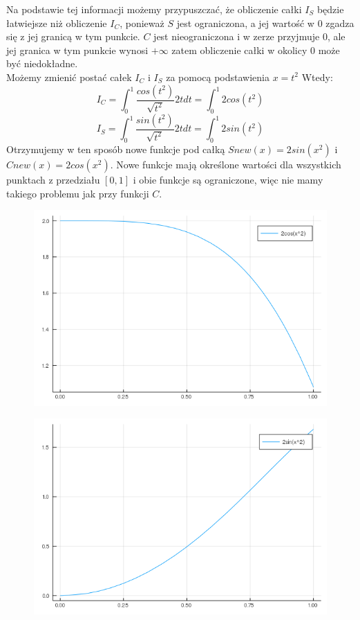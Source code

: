 \documentclass{article}
\begin{document}
Na podstawie tej informacji możemy przypuszczać, że obliczenie całki $I_S$ będzie łatwiejsze niż obliczenie $I_C$, ponieważ $S$ jest ograniczona, a jej wartość w $0$ zgadza się z jej granicą w tym punkcie. $C$ jest nieograniczona i w zerze przyjmuje $0$, ale jej granica w tym punkcie wynosi $+\infty$ zatem obliczenie całki w okolicy $0$ może być niedokładne.\\
Możemy zmienić postać całek $I_C$ i $I_S$ za pomocą podstawienia $x=t^2$ Wtedy:
\begin{equation}
I_C = \int_0^1 \frac{cos(t^2)}{\sqrt{t^2}} 2tdt = \int_0^1 2cos(t^2)
\end{equation}
\begin{equation}
I_S = \int_0^1 \frac{sin(t^2)}{\sqrt{t^2}} 2tdt = \int_0^1 2sin(t^2)
\end{equation}
Otrzymujemy w ten sposób nowe funkcje pod całką $Snew(x) = 2sin(x^2)$ i $Cnew(x) = 2cos(x^2)$. Nowe funkcje mają określone wartości dla wszystkich punktach z przedziału $[0,1]$ i obie funkcje są ograniczone, więc nie mamy takiego problemu jak przy funkcji $C$.
\begin{figure}[ht]
    \includegraphics[scale=0.5]{WykresCnew.png}
    \label{wykresCnew}
\end{figure}
\begin{figure}[ht]
    \includegraphics[scale=0.5]{WykresSnew.png}
    \label{WykresSnew}
\end{figure}
\end{document}
